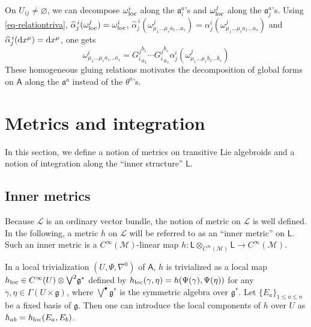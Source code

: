 \documentclass[number]{elsarticle}
\theoremstyle{definition}
\theoremstyle{remark}
\numberwithin{equation}{section}
\begin{document}
On $U_{ij} \neq {{\varnothing}}$, we can decompose $\omega^i_{{\text{\textup{loc}}}}$ along the ${\mathfrak{a}}_i^a$'s and $\omega^j_{{\text{\textup{loc}}}}$ along the ${\mathfrak{a}}_j^a$'s. Using \eqref{eq-relationtriva}, ${\widehat{\alpha}}_{j}^{\,i}(\omega^j_{{\text{\textup{loc}}}}) = \omega^i_{{\text{\textup{loc}}}}$, ${\widehat{\alpha}}_{j}^{\,i}(\omega^j_{\mu_1 \ldots \mu_r a_1 \ldots a_s}) = \alpha_{j}^{i}(\omega^j_{\mu_1 \ldots \mu_r a_1 \ldots a_s})$ and ${\widehat{\alpha}}_{j}^{\,i}({\text{\textup{d}}} x^\mu) = {\text{\textup{d}}} x^\mu$, one gets
\begin{equation}
\label{eq-relationtrivcomponentsona}
\omega^i_{\mu_1 \ldots \mu_r a_1 \ldots a_s} = {G^{j}_{i}}^{b_1}_{a_1} \cdots {G^{j}_{i}}^{b_s}_{a_s} \alpha_{j}^{i}(\omega^j_{\mu_1 \ldots \mu_r b_1 \ldots b_s})
\end{equation}
These homogeneous gluing relations motivates the decomposition of global forms on ${{{{\mathbf{\mathsf{{A}}}}}}}$ along the ${\mathfrak{a}}^a$ instead of the $\theta^a$'s.

\section{Metrics and integration}
\label{sec-metric-integration}

In this section, we define a notion of metrics on transitive Lie algebroids and a notion of integration along the ``inner structure'' ${{{{\mathbf{\mathsf{{L}}}}}}}$.

\subsection{Inner metrics}
\label{subsec-innermetrics}

Because ${{{{\mathcal{{L}}}}}}$ is an ordinary vector bundle, the notion of metric on ${{{{\mathcal{{L}}}}}}$ is well defined. In the following, a metric $h$ on ${{{{\mathcal{{L}}}}}}$ will be referred to as an ``inner metric'' on ${{{{\mathbf{\mathsf{{L}}}}}}}$. Such an inner metric is a $C^\infty({{{{\mathcal{{M}}}}}})$-linear map $h : {{{{\mathbf{\mathsf{{L}}}}}}} \otimes_{C^\infty({{{{\mathcal{{M}}}}}})} {{{{\mathbf{\mathsf{{L}}}}}}} \rightarrow C^\infty({{{{\mathcal{{M}}}}}})$. 

In a local trivialization $(U, \Psi, \nabla^{0})$ of ${{{{\mathbf{\mathsf{{A}}}}}}}$, $h$ is trivialized as a local map $h_{{\text{\textup{loc}}}} \in C^\infty(U) \otimes {{\textstyle\bigvee}}^2 {{\mathfrak g}}^{\ast}$ defined by $h_{{\text{\textup{loc}}}}(\gamma, \eta) = h(\Psi(\gamma), \Psi(\eta))$ for any $\gamma, \eta \in \Gamma(U \times {{\mathfrak g}})$, where ${{\textstyle\bigvee}}^{\bullet} {{\mathfrak g}}^{\ast}$ is the symmetric algebra over ${{\mathfrak g}}^{\ast}$. Let $\{E_a\}_{1 \leq a \leq n}$ be a fixed basis of ${{\mathfrak g}}$. Then one can introduce the local components of $h$ over $U$ as $h_{ab} = h_{{\text{\textup{loc}}}}(E_a, E_b)$.
\end{document}
